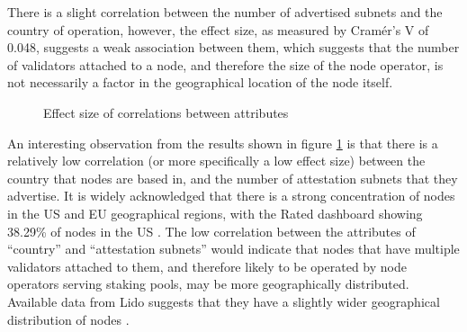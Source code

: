 \documentclass[conference]{IEEEtran}
\begin{document}
There is a slight correlation between the number of advertised subnets and the country of operation, however, the effect size, as measured by Cramér's V of 0.048, suggests a weak association between them, which suggests that the number of validators attached to a node, and therefore the size of the node operator, is not necessarily a factor in the geographical location of the node itself.

\begin{figure}[htbp]
    \centering
    \caption{Effect size of correlations between attributes}
    \label{fig:relative-level-of-correlation-between-attributes}
\end{figure}

An interesting observation from the results shown in figure \ref{fig:relative-level-of-correlation-between-attributes} is that there is a relatively low correlation (or more specifically a low effect size) between the country that nodes are based in, and the number of attestation subnets that they advertise.  It is widely acknowledged that there is a strong concentration of nodes in the US and EU geographical regions, with the Rated dashboard showing 38.29\% of nodes in the US \cite{ratednetwork2024}.  The low correlation between the attributes of ``country'' and ``attestation subnets'' would indicate that nodes that have multiple validators attached to them, and therefore likely to be operated by node operators serving staking pools, may be more geographically distributed.  Available data from Lido suggests that they have a slightly wider geographical distribution of nodes \cite{lido2024}.
\end{document}
